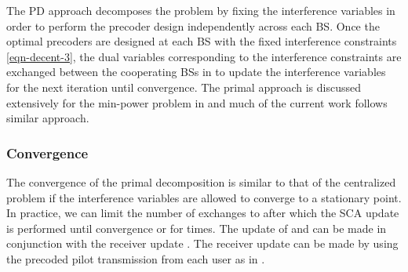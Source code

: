 
The \acl{PD} approach decomposes the problem by fixing the interference variables  in order to perform the precoder design independently across each \ac{BS}. Once the optimal precoders are designed at each \ac{BS} with the fixed interference constraints \eqref{eqn-decent-3}, the dual variables corresponding to the interference constraints are exchanged between the cooperating \acp{BS} in  to update the interference variables  for the next iteration until convergence. The primal approach is discussed extensively for the min-power problem in \cite{pennanen2011decentralized} and much of the current work follows similar approach. 

\subsubsection*{Convergence}
The convergence of the primal decomposition is similar to that of the centralized problem if the interference variables  are allowed to converge to a stationary point. In practice, we can limit the number of exchanges to  after which the \ac{SCA} update is performed until convergence or for  times. The update of  and  can be made in conjunction with the receiver update . The receiver update can be made by using the precoded pilot transmission from each user as in \cite{komulainen2013effective}. 